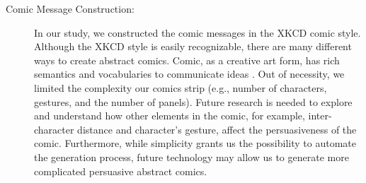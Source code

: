 \begin{description}
 \item[Comic Message Construction:] In our study, we constructed the comic messages in the XKCD comic style. Although the XKCD style is easily recognizable, there are many different ways to create abstract comics.  Comic, as a creative art form, has rich semantics and vocabularies to communicate ideas \cite{scott1993understanding}. Out of necessity, we limited the complexity our comics strip (e.g., number of characters, gestures, and the number of panels). Future research is needed to explore and understand how other elements in the comic, for example, inter-character distance and character's gesture, affect the persuasiveness of the comic. Furthermore, while simplicity grants us the possibility to automate the generation process, future technology may allow us to generate more complicated persuasive abstract comics.
  
\end{description}



